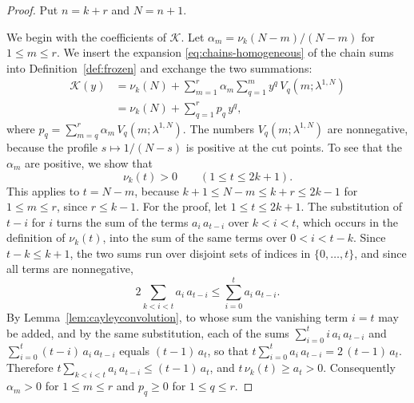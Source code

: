 \documentclass{amsart}
\theoremstyle{definition}
\theoremstyle{remark}
\numberwithin{equation}{section}
\begin{document}
\begin{proof}
Put $n=k+r$ and $N=n+1$.

We begin with the coefficients of $\mathcal K$. Let $\alpha_m=\nu_k(N-m)/(N-m)$ for $1\le m\le r$. We insert the expansion \eqref{eq:chains-homogeneous} of the chain sums into Definition~\ref{def:frozen} and exchange the two summations:
\begin{align*}
\mathcal K(y)&=\nu_k(N)+\sum_{m=1}^{r}\alpha_m\sum_{q=1}^{m}y^{q}\,V_q(m;\lambda^{1,N})\\
&=\nu_k(N)+\sum_{q=1}^{r}p_q\,y^q,
\end{align*}
where $p_q=\sum_{m=q}^{r}\alpha_m\,V_q(m;\lambda^{1,N})$. The numbers $V_q(m;\lambda^{1,N})$ are nonnegative, because the profile $s\mapsto 1/(N-s)$ is positive at the cut points. To see that the $\alpha_m$ are positive, we show that
\[
\nu_k(t)>0\qquad(1\le t\le 2k+1).
\]
This applies to $t=N-m$, because $k+1\le N-m\le k+r\le 2k-1$ for $1\le m\le r$, since $r\le k-1$. For the proof, let $1\le t\le 2k+1$. The substitution of $t-i$ for $i$ turns the sum of the terms $a_i\,a_{t-i}$ over $k<i<t$, which occurs in the definition of $\nu_k(t)$, into the sum of the same terms over $0<i<t-k$. Since $t-k\le k+1$, the two sums run over disjoint sets of indices in $\{0,\dots,t\}$, and since all terms are nonnegative,
\[
2\sum_{k<i<t}a_i\,a_{t-i}\le\sum_{i=0}^{t}a_i\,a_{t-i}.
\]
By Lemma~\ref{lem:cayleyconvolution}, to whose sum the vanishing term $i=t$ may be added, and by the same substitution, each of the sums $\sum_{i=0}^{t}i\,a_i\,a_{t-i}$ and $\sum_{i=0}^{t}(t-i)\,a_i\,a_{t-i}$ equals $(t-1)\,a_t$, so that $t\sum_{i=0}^{t}a_i\,a_{t-i}=2\,(t-1)\,a_t$. Therefore $t\sum_{k<i<t}a_i\,a_{t-i}\le(t-1)\,a_t$, and $t\,\nu_k(t)\ge a_t>0$. Consequently $\alpha_m>0$ for $1\le m\le r$ and $p_q\ge 0$ for $1\le q\le r$.


\end{proof}
\end{document}
